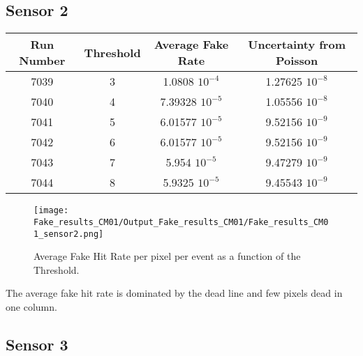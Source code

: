 \documentclass[a4papper, 11pt]{article}
\begin{document}
        \subsection{Sensor 2}

            \begin{center}
                \begin{tabular}{|c|c|c|c|}
                  \hline %
\rowcolor{light-gray}  Run Number  &   Threshold   &   Average Fake Rate    &   Uncertainty from Poisson         \tabularnewline
                  \hline %
                        7039    &       3       &  1.0808 $10^{-4}$ & 1.27625 $10^{-8}$ \tabularnewline
                  \hline %
                        7040    &       4       &  7.39328 $10^{-5}$ & 1.05556 $10^{-8}$ \tabularnewline
                  \hline %
                        7041    &       5       &  6.01577 $10^{-5}$ & 9.52156 $10^{-9}$ \tabularnewline
                  \hline %
                        7042    &       6       &  6.01577 $10^{-5}$ & 9.52156 $10^{-9}$ \tabularnewline
                  \hline %
                        7043    &       7       &  5.954 $10^{-5}$  & 9.47279 $10^{-9}$ \tabularnewline
                  \hline %
                        7044    &       8       & 5.9325 $10^{-5}$  & 9.45543 $10^{-9}$ \tabularnewline
                  \hline %
                \end{tabular}
            \end{center}
        \begin{figure}[!h]
            \centering
            \texttt{[image: Fake\_results\_CM01/Output\_Fake\_results\_CM01/Fake\_results\_CM01\_sensor2.png]}
            \caption{Average Fake Hit Rate per pixel per event as a function of the Threshold.}
        \end{figure}
    \FloatBarrier 

        The average fake hit rate is dominated by the dead line and few pixels dead in one column. 

        \subsection{Sensor 3}
        
\end{document}

